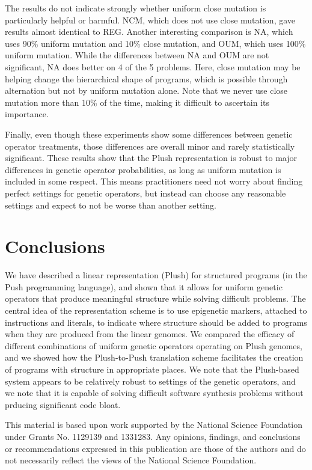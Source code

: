 \documentclass[graybox]{svmult}
\begin{document}
The results do not indicate strongly whether uniform close mutation is particularly helpful or harmful. NCM, which does not use close mutation, gave results almost identical to REG. Another interesting comparison is NA, which uses 90\% uniform mutation and 10\% close mutation, and OUM, which uses 100\% uniform mutation. While the differences between NA and OUM are not significant, NA does better on 4 of the 5 problems. Here, close mutation may be helping change the hierarchical shape of programs, which is possible through alternation but not by uniform mutation alone. Note that we never use close mutation more than 10\% of the time, making it difficult to ascertain its importance.

Finally, even though these experiments show some differences between genetic operator treatments, those differences are overall minor and rarely statistically significant. These results show that the Plush representation is robust to major differences in genetic operator probabilities, as long as uniform mutation is included in some respect. This means practitioners need not worry about finding perfect settings for genetic operators, but instead can choose any reasonable settings and expect to not be worse than another setting.


\section{Conclusions}

We have described a linear representation (Plush) for structured programs (in the Push programming language), and shown that it allows for uniform genetic operators that produce meaningful structure while solving difficult problems. The central idea of the representation scheme is to use epigenetic markers, attached to instructions and literals, to indicate where structure should be added to programs when they are produced from the linear genomes. We compared the efficacy of different combinations of uniform genetic operators operating on Plush genomes, and we showed how the Plush-to-Push translation scheme facilitates the creation of programs with structure in appropriate places. We note that the Plush-based system appears to be relatively robust to settings of the genetic operators, and we note that it is capable of solving difficult software synthesis problems without prducing significant code bloat.



\begin{acknowledgement}
This material is based upon work supported by the National Science Foundation under Grants No. 1129139 and 1331283. Any opinions, findings, and conclusions or recommendations expressed in this publication are those of the authors and do not necessarily reflect the views of the National Science Foundation.
\end{acknowledgement}


\end{document}
